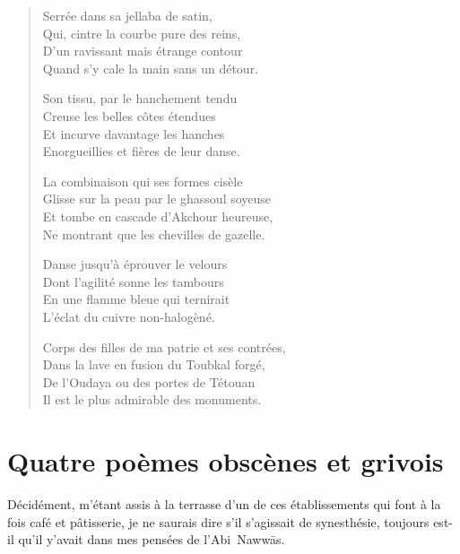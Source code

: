 \begin{verse}
Serrée dans sa jellaba de satin,\\
Qui, cintre la courbe pure des reins,\\
D’un ravissant mais étrange contour\\
Quand s’y cale la main sans un détour.

Son tissu, par le hanchement tendu\\
Creuse les belles côtes étendues\\
Et incurve davantage les hanches\\
Enorgueillies et fières de leur danse.

La combinaison qui ses formes cisèle\\
Glisse sur la peau par le ghassoul soyeuse\\
Et tombe en cascade d’Akchour heureuse,\\
Ne montrant que les chevilles de gazelle.

Danse jusqu’à éprouver le velours\\
Dont l’agilité sonne les tambours\\
En une flamme bleue qui ternirait\\
L’éclat du cuivre non-halogèné.

Corps des filles de ma patrie et ses contrées,\\
Dans la lave en fusion du Toubkal forgé,\\
De l’Oudaya ou des portes de Tétouan\\
Il est le plus admirable des monuments.
\end{verse}


\section*{Quatre poèmes obscènes et grivois}
\begin{prose}
Décidément, m’étant assis à la terrasse d’un de ces établissements qui font à la fois café et pâtisserie, je ne saurais dire s’il s’agissait de synesthésie, toujours est-il qu’il y’avait dans mes pensées de l’Abi~Nawwās.
\end{prose}


